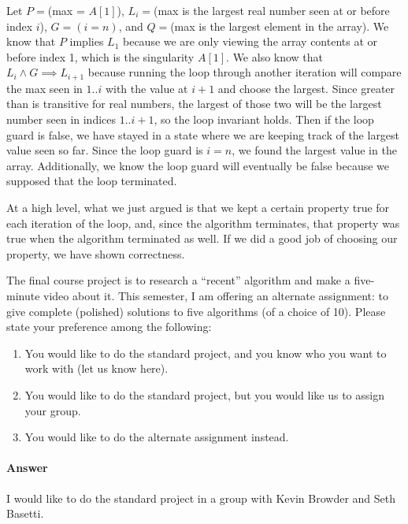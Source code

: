 \documentclass{article}
\begin{document}
Let $P = $(max = $A[1]$), $L_i = $(max is the largest real number seen at or before index $i$), $G = (i = n)$, and $Q = $(max is the largest element in the array).
We know that $P$ implies $L_1$ because we are only viewing the array contents at or before index 1, which is the singularity $A[1]$.
We also know that $L_i \land G \implies L_{i+1}$ because running the loop through another iteration will compare the max seen in $1..i$ with the value at $i+1$ and choose the largest.
Since greater than is transitive for real numbers, the largest of those two will be the largest number seen in indices $1..i+1$, so the loop invariant holds.
Then if the loop guard is false, we have stayed in a state where we are keeping track of the largest value seen so far.
Since the loop guard is $i = n$, we found the largest value in the array.
Additionally, we know the loop guard will eventually be false because we supposed that the loop terminated.

At a high level, what we just argued is that we kept a certain property true for each iteration of the loop, and, since the algorithm terminates, that property was true when the algorithm terminated as well.
If we did a good job of choosing our property, we have shown correctness.


\nextprob
{}

The final course project is to research a ``recent'' algorithm and make a
five-minute video about it.  This semester, I am offering an alternate
assignment: to give complete (polished) solutions to five algorithms (of a
choice of 10).
Please state your preference among the following:

\begin{enumerate}
    \item You would like to do the standard project, and you know who you want to work with (let us know here).
    \item You would like to do the standard project, but you would like us to assign your group.
    \item You would like to do the alternate assignment instead.
\end{enumerate}

\paragraph{Answer}


I would like to do the standard project in a group with Kevin Browder and Seth Basetti.

\end{document}
